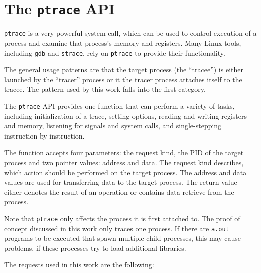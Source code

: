 \documentclass[draft,final]{vutinfth} %
\begin{document}
\section{The \texttt{ptrace} API}
\label{ptrace api}

\texttt{ptrace} is a very powerful system call, which can be used to control execution of a process and examine that process's memory and registers. Many Linux tools, including \texttt{gdb} and \texttt{strace}, rely on \texttt{ptrace} to provide their functionality.

The general usage patterns are that the target process (the ``tracee'') is either launched by the ``tracer'' process or it the tracer process attaches itself to the tracee. The pattern used by this work falls into the first category.

The \texttt{ptrace} API provides one function that can perform a variety of tasks, including initialization of a trace, setting options, reading and writing registers and memory, listening for signals and system calls, and single-stepping instruction by instruction.

The function accepts four parameters: the request kind, the PID of the target process and two pointer values: address and data. The request kind describes, which action should be performed on the target process. The address and data values are used for transferring data to the target process. The return value either denotes the result of an operation or contains data retrieve from the process.

Note that \texttt{ptrace} only affects the process it is first attached to. The proof of concept discussed in this work only traces one process. If there are \texttt{a.out} programs to be executed that spawn multiple child processes, this may cause problems, if these processes try to load additional libraries.

The requests used in this work are the following:
\end{document}
